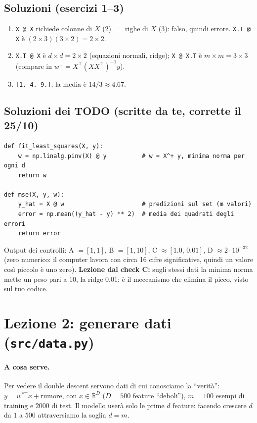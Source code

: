 \documentclass[11pt,a4paper]{article}
\begin{document}
\subsection*{Soluzioni (esercizi 1--3)}
\begin{enumerate}
  \item \texttt{X @ X} richiede colonne di $X$ ($2$) $=$ righe di $X$ ($3$): falso, quindi errore.
        \texttt{X.T @ X} è $(2\times 3)(3\times 2) = 2\times 2$.
  \item \texttt{X.T @ X} è $d\times d = 2\times 2$ (equazioni normali, ridge); \texttt{X @ X.T} è $m\times m = 3\times 3$
        (compare in $w^{+} = X^\top(XX^\top)^{-1}y$).
  \item \texttt{[1. 4. 9.]}; la media è $14/3 \approx 4.67$.
\end{enumerate}
\subsection*{Soluzioni dei TODO (scritte da te, corrette il 25/10)}
\begin{lstlisting}
def fit_least_squares(X, y):
    w = np.linalg.pinv(X) @ y          # w = X^+ y, minima norma per ogni d
    return w

def mse(X, y, w):
    y_hat = X @ w                      # predizioni sul set (m valori)
    error = np.mean((y_hat - y) ** 2)  # media dei quadrati degli errori
    return error
\end{lstlisting}
Output dei controlli: A $=[1,1]$, B $=[1,10]$, C $\approx[1.0,\,0.01]$, D $\approx 2\cdot10^{-32}$ (zero numerico: il
computer lavora con circa 16 cifre significative, quindi un valore così piccolo è uno zero).
\textbf{Lezione dal check C:} sugli stessi dati la minima norma mette un peso pari a $10$, la ridge $0.01$:
è il meccanismo che elimina il picco, visto sul tuo codice.

\section{Lezione 2: generare dati (\texttt{src/data.py})}
\paragraph{A cosa serve.} Per vedere il double descent servono dati di cui conosciamo la ``verità'':
$y = w^{*\top}x + \text{rumore}$, con $x \in \mathbb{R}^D$ ($D=500$ feature ``deboli''), $m=100$ esempi di training
e $2000$ di test. Il modello userà solo le prime $d$ feature: facendo crescere $d$ da $1$ a $500$ attraversiamo la soglia $d=m$.
\end{document}

